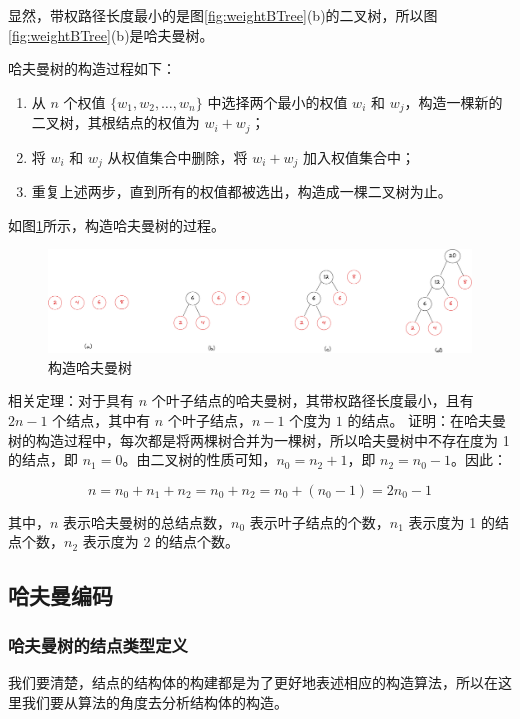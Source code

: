 \documentclass[lang=cn,newtx,10pt,scheme=chinese]{../elegantbook}
\begin{document}
显然，带权路径长度最小的是图\ref{fig:weightBTree}(b)的二叉树，所以图\ref{fig:weightBTree}(b)是哈夫曼树。

哈夫曼树的构造过程如下：

\begin{enumerate}
  \item 从 $n$ 个权值 $\{w_1, w_2, \dots, w_n\}$ 中选择两个最小的权值 $w_i$ 和 $w_j$，构造一棵新的二叉树，其根结点的权值为 $w_i + w_j$；
  \item 将 $w_i$ 和 $w_j$ 从权值集合中删除，将 $w_i + w_j$ 加入权值集合中；
  \item 重复上述两步，直到所有的权值都被选出，构造成一棵二叉树为止。
  \end{enumerate}

如图\ref{fig:HuffmanTree}所示，构造哈夫曼树的过程。

\begin{figure}[h!]
  \centering
  \includegraphics[width=1\textwidth]{./figure/pdf/cropped/createHaffman.pdf}
  \caption{构造哈夫曼树}
  \label{fig:HuffmanTree}
\end{figure}

相关定理：对于具有 $n$ 个叶子结点的哈夫曼树，其带权路径长度最小，且有 $2n-1$ 个结点，其中有 $n$ 个叶子结点，$n-1$ 个度为 $1$ 的结点。
证明：在哈夫曼树的构造过程中，每次都是将两棵树合并为一棵树，所以哈夫曼树中不存在度为 1 的结点，即 $n_1 = 0$。由二叉树的性质可知，$n_0 = n_2 + 1$，即 $n_2 = n_0 - 1$。因此：

\[
n = n_0 + n_1 + n_2 = n_0 + n_2 = n_0 + (n_0 - 1) = 2n_0 - 1
\]

其中，$n$ 表示哈夫曼树的总结点数，$n_0$ 表示叶子结点的个数，$n_1$ 表示度为 1 的结点个数，$n_2$ 表示度为 2 的结点个数。

\subsection{哈夫曼编码}
\subsubsection{哈夫曼树的结点类型定义}

我们要清楚，结点的结构体的构建都是为了更好地表述相应的构造算法，所以在这里我们要从算法的角度去分析结构体的构造。
\end{document}
